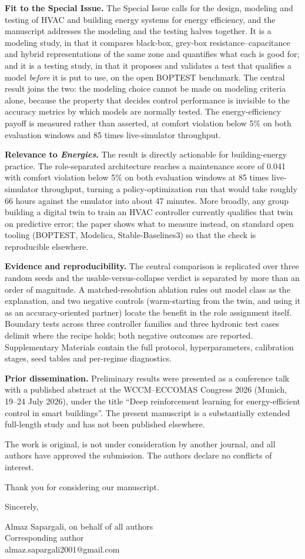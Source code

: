 \documentclass[11pt,a4paper]{article}
\begin{document}
\textbf{Fit to the Special Issue.} The Special Issue calls for the design, modeling and testing of
HVAC and building energy systems for energy efficiency, and the manuscript addresses the modeling
and the testing halves together. It is a modeling study, in that it compares black-box, grey-box
resistance--capacitance and hybrid representations of the same zone and quantifies what each is
good for; and it is a testing study, in that it proposes and validates a test that qualifies a
model \emph{before} it is put to use, on the open BOPTEST benchmark. The central result joins the
two: the modeling choice cannot be made on modeling criteria alone, because the property that
decides control performance is invisible to the accuracy metrics by which models are normally
tested. The energy-efficiency payoff is measured rather than asserted, at comfort violation below
5\% on both evaluation windows and 85 times live-simulator throughput.

\textbf{Relevance to \emph{Energies}.} The result is directly actionable for building-energy
practice. The role-separated architecture reaches a maintenance score of 0.041 with comfort
violation below 5\% on both evaluation windows at 85 times live-simulator throughput, turning a
policy-optimization run that would take roughly 66 hours against the emulator into about 47 minutes.
More broadly, any group building a digital twin to train an HVAC controller currently qualifies that
twin on predictive error; the paper shows what to measure instead, on standard open tooling
(BOPTEST, Modelica, Stable-Baselines3) so that the check is reproducible elsewhere.

\textbf{Evidence and reproducibility.} The central comparison is replicated over three random seeds
and the usable-versus-collapse verdict is separated by more than an order of magnitude. A
matched-resolution ablation rules out model class as the explanation, and two negative controls
(warm-starting from the twin, and using it as an accuracy-oriented partner) locate the benefit in
the role assignment itself. Boundary tests across three controller families and three hydronic test
cases delimit where the recipe holds; both negative outcomes are reported. Supplementary Materials
contain the full protocol, hyperparameters, calibration stages, seed tables and per-regime
diagnostics.

\textbf{Prior dissemination.} Preliminary results were presented as a conference talk with a
published abstract at the WCCM--ECCOMAS Congress 2026 (Munich, 19--24 July 2026), under the title
``Deep reinforcement learning for energy-efficient control in smart buildings''. The present
manuscript is a substantially extended full-length study and has not been published elsewhere.

The work is original, is not under consideration by another journal, and all authors have approved
the submission. The authors declare no conflicts of interest.

Thank you for considering our manuscript.

Sincerely,

Almaz Sapargali, on behalf of all authors\\
Corresponding author\\
almaz.sapargali2001@gmail.com
\end{document}
